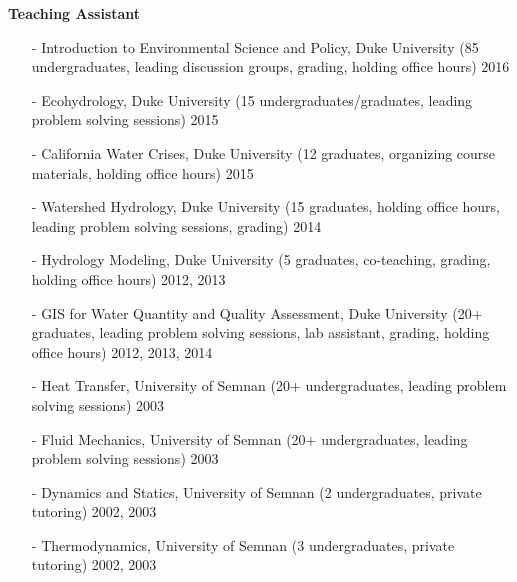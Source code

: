 \documentclass[10pt]{article}
\newenvironment{changemargin}[2]{%
  \begin{list}{}{%
 \setlength{\topsep}{0pt}%
 \setlength{\leftmargin}{#1}%
 \setlength{\rightmargin}{#2}%
 \setlength{\listparindent}{\parindent}%
 \setlength{\itemindent}{\parindent}%
 \setlength{\parsep}{\parskip}%
  }%
  \item[]}{\end{list}
}
\newenvironment{body} {
  \vspace*{-2pt}
  \begin{changemargin}{-0.5in}{-0.5in}
}
{\end{changemargin}
}
\begin{document}
\begin{body}
  \textbf {Teaching Assistant}\\
  \vspace*{-4pt}
  \begin{itemize} \itemsep -0pt
    \item[-]Introduction to Environmental Science and Policy, Duke University (85 undergraduates, leading discussion groups, grading, holding office hours) \hfill {2016}
    \item[-]Ecohydrology, Duke University (15 undergraduates/graduates, leading problem solving sessions) \hfill {2015}
    \item[-]California Water Crises, Duke University (12 graduates, organizing course materials, holding office hours) \hfill {2015}
    \item[-]Watershed Hydrology, Duke University (15 graduates, holding office hours, leading problem solving sessions, grading) \hfill {2014}
    \item[-]Hydrology Modeling, Duke University (5 graduates, co-teaching, grading, holding office hours) \hfill {2012, 2013}
    \item[-]GIS for Water Quantity and Quality Assessment, Duke University (20+ graduates, leading problem solving sessions, lab assistant, grading, holding office hours) \hfill {2012, 2013, 2014}
    \item[-]Heat Transfer, University of Semnan  (20+ undergraduates,  leading problem solving sessions) \hfill {2003}
    \item[-]Fluid Mechanics, University of Semnan  (20+ undergraduates,  leading problem solving sessions) \hfill {2003}
    \item[-]Dynamics and Statics, University of Semnan (2 undergraduates, private tutoring) \hfill {2002, 2003}
    \item[-]Thermodynamics, University of Semnan  (3 undergraduates, private tutoring) \hfill {2002, 2003}
  \end{itemize}

  \medskip
\end{body}
\medskip
\end{document}
